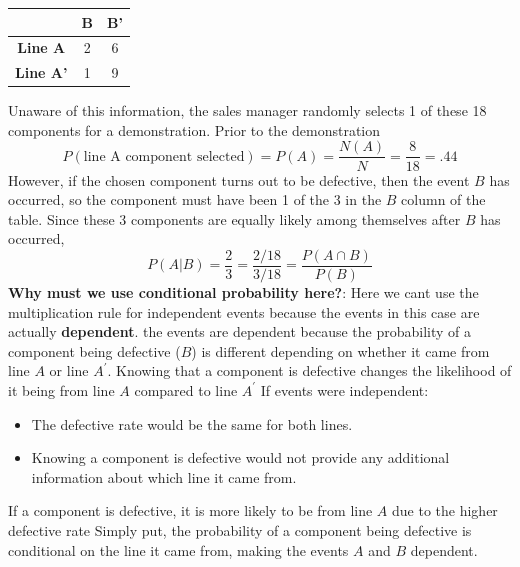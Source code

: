 \documentclass{report}
\begin{document}
\begin{itemize}
            \begin{table}[h!]
                \centering
                \begin{tabular}{|c|c|c|}
                    \hline
                     & \textbf{B} & \textbf{B'} \\
                     \hline
                    \textbf{Line A} & 2 & 6 \\
                    \hline
                    \textbf{Line A'} & 1 & 9 \\
                    \hline
                \end{tabular}
            \end{table}
            Unaware of this information, the sales manager randomly selects 1 of these 18 components for a demonstration. Prior to the demonstration
            \[
                P(\text{line A component selected}) = P(A) = \frac{N(A)}{N} = \frac{8}{18} = .44
            \]
            However, if the chosen component turns out to be defective, then the event $B$ has occurred, so the component must have been 1 of the 3 in the $B$ column of the table. Since these 3 components are equally likely among themselves after $B$ has occurred,
            \[
                P(A|B) = \frac{2}{3} = \frac{2/18}{3/18} = \frac{P(A \cap B)}{P(B)}
            \]
            \bigbreak \noindent 
            \textbf{Why must we use conditional probability here?}: Here we cant use the multiplication rule for independent events because the events in this case are actually \textbf{dependent}. the events are dependent because the probability of a component being defective ($B$) is different depending on whether it came from line  $A$ or line  $A^{\prime}$. Knowing that a component is defective changes the likelihood of it being from line  $A$ compared to line $A^{\prime}$ 
            \bigbreak \noindent 
            If events were independent:
            \begin{itemize}
                \item The defective rate would be the same for both lines.
                \item Knowing a component is defective would not provide any additional information about which line it came from.
            \end{itemize}
            If a component is defective, it is more likely to be from line $A$ due to the higher defective rate
            \bigbreak \noindent 
            Simply put, the probability of a component being defective is conditional on the line it came from, making the events $A$ and  $B$ dependent.

 




    \end{itemize}
\end{document}
